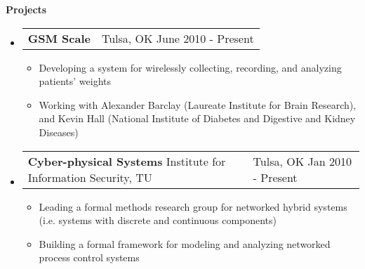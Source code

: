 \documentclass[letterpaper,11pt]{article}
\makeatletter
\newcommand{\resitem}[1]{\item \parbox[t]{4.6in}{#1} \vspace{-2pt}}
\newcommand{\resheading}[1]{{\large \colorbox{mygrey}{\begin{minipage}
    {\textwidth}{\textbf{#1 \vphantom{p\^{E}}}}\end{minipage}}}}
\newcommand{\resentry}[3][0pt]{
    \begin{tabular*}{0.9\textwidth}[t]{@{\hspace{#1}}p{5.0in}@{\extracolsep{\fill}}p{0.75in}}
        #2 & #3
        \tabularnewline
    \end{tabular*} %
}
\newcommand{\ressubheading}[4]{
    \resentry{\textbf{#1} \newline #3}{#2 \newline #4}    
}
\makeatother
\begin{document}
\resheading{Projects}

\begin{itemize}
\item
	\ressubheading{GSM Scale}{Tulsa, OK}{}{June 2010 - Present}
	\begin{itemize}
		\resitem{Developing a system for wirelessly collecting, recording, and analyzing patients' weights}
		\resitem{Working with Alexander Barclay (Laureate Institute for Brain Research), and Kevin Hall (National Institute of Diabetes and Digestive and Kidney Diseases)}
	\end{itemize}

\item
	\ressubheading{Cyber-physical Systems}{Tulsa, OK}{Institute for Information Security, TU}{Jan 2010 - Present}
	\begin{itemize}
		\resitem{Leading a formal methods research group for networked hybrid systems (i.e. systems with discrete and continuous components)}
		\resitem{Building a formal framework for modeling and analyzing networked process control systems}
	\end{itemize}




\end{itemize}
\end{document}
